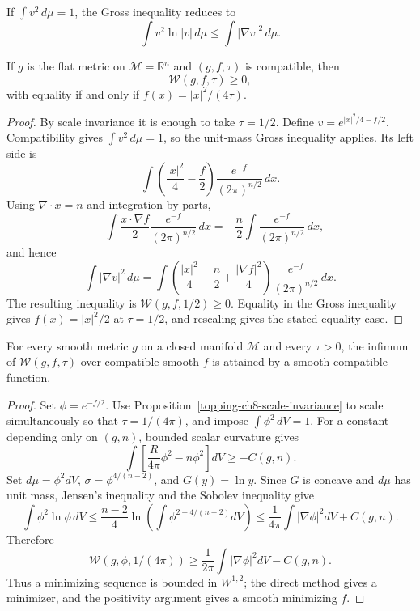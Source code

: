 \begin{remark}
\label{topping-ch8-gross-unit-mass}
If $\int v^2\,d\mu=1$, the Gross inequality reduces to
\[
\int v^2\ln|v|\,d\mu\leq\int|\nabla v|^2\,d\mu.
\]
\end{remark}

\begin{lemma}
\label{topping-ch8-euclidean-w-nonnegative}

If $g$ is the flat metric on $\mathcal M=\mathbb R^n$ and $(g,f,\tau)$ is
compatible, then
\[
\mathcal W(g,f,\tau)\geq0,
\]
with equality if and only if
$f(x)=|x|^2/(4\tau)$.
\end{lemma}

\begin{proof}
\sketch By scale invariance it is enough to take $\tau=1/2$. Define
$v=e^{|x|^2/4-f/2}$. Compatibility gives
$\int v^2\,d\mu=1$, so the unit-mass Gross inequality applies. Its left
side is
\[
\int\left(\frac{|x|^2}{4}-\frac f2\right)
\frac{e^{-f}}{(2\pi)^{n/2}}\,dx.
\]
Using $\nabla\!\cdot x=n$ and integration by parts,
\[
-\int\frac{x\cdot\nabla f}{2}\frac{e^{-f}}{(2\pi)^{n/2}}\,dx
=-\frac n2\int\frac{e^{-f}}{(2\pi)^{n/2}}\,dx,
\]
and hence
\[
\int|\nabla v|^2\,d\mu
=\int\left(\frac{|x|^2}{4}-\frac n2+\frac{|\nabla f|^2}{4}\right)
\frac{e^{-f}}{(2\pi)^{n/2}}\,dx.
\]
The resulting inequality is $\mathcal W(g,f,1/2)\geq0$. Equality in the
Gross inequality gives $f(x)=|x|^2/2$ at $\tau=1/2$, and rescaling gives the
stated equality case.
\end{proof}

\begin{lemma}
\label{topping-ch8-minimiser-exists}

For every smooth metric $g$ on a closed manifold $\mathcal M$ and every
$\tau>0$, the infimum of $\mathcal W(g,f,\tau)$ over compatible smooth $f$
is attained by a smooth compatible function.
\end{lemma}
\begin{proof}
\sketch Set $\phi=e^{-f/2}$. Use Proposition~\ref{topping-ch8-scale-invariance} to scale simultaneously
so that $\tau=1/(4\pi)$, and impose $\int\phi^2\,dV=1$. For a constant
depending only on $(g,n)$, bounded scalar curvature gives
\[
\int\left[\frac{R}{4\pi}\phi^2-n\phi^2\right]dV\geq-C(g,n).
\]
Set $d\mu=\phi^2dV$, $\sigma=\phi^{4/(n-2)}$, and $G(y)=\ln y$. Since
$G$ is concave and $d\mu$ has unit mass, Jensen's inequality and the Sobolev
inequality give
\[
\int\phi^2\ln\phi\,dV
\leq\frac{n-2}{4}\ln\left(\int\phi^{2+4/(n-2)}dV\right)
\leq\frac{1}{4\pi}\int|\nabla\phi|^2dV+C(g,n).
\]
Therefore
\[
\mathcal W(g,\phi,1/(4\pi))
\geq\frac{1}{2\pi}\int|\nabla\phi|^2dV-C(g,n).
\]
Thus a minimizing sequence is bounded in $W^{1,2}$; the direct method gives a
minimizer, and the positivity argument gives a smooth minimizing $f$.
\end{proof}

